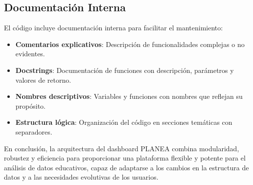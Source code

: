 \subsection{Documentación Interna}
El código incluye documentación interna para facilitar el mantenimiento:

\begin{itemize}
    \item \textbf{Comentarios explicativos}: Descripción de funcionalidades complejas o no evidentes.
    \item \textbf{Docstrings}: Documentación de funciones con descripción, parámetros y valores de retorno.
    \item \textbf{Nombres descriptivos}: Variables y funciones con nombres que reflejan su propósito.
    \item \textbf{Estructura lógica}: Organización del código en secciones temáticas con separadores.
\end{itemize}

En conclusión, la arquitectura del dashboard PLANEA combina modularidad, robustez y eficiencia para proporcionar una plataforma flexible y potente para el análisis de datos educativos, capaz de adaptarse a los cambios en la estructura de datos y a las necesidades evolutivas de los usuarios.
